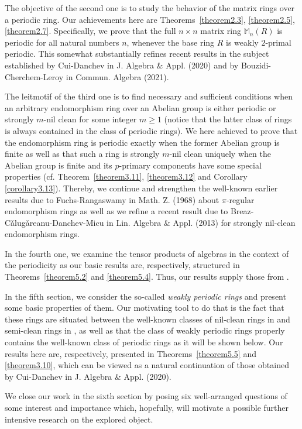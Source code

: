 \documentclass[12pt]{amsart}
\theoremstyle{definition}
\theoremstyle{remark}
\numberwithin{equation}{section}
\begin{document}
The objective of the second one is to study the behavior of the matrix rings over a periodic ring. Our achievements here are Theorems~\ref{theorem2.3}, \ref{theorem2.5}, \ref{theorem2.7}. Specifically, we prove that the full $n\times n$ matrix ring $\mathbb{M}_n(R)$ is periodic for all natural numbers $n$, whenever the base ring $R$ is weakly $2$-primal periodic. This somewhat substantially refines recent results in the subject established by Cui-Danchev in J. Algebra \& Appl. (2020) and by Bouzidi-Cherchem-Leroy in Commun. Algebra (2021).

The leitmotif of the third one is to find necessary and sufficient conditions when an arbitrary endomorphism ring over an Abelian group is either periodic or strongly $m$-nil clean for some integer $m\geq 1$ (notice that the latter class of rings is always contained in the class of periodic rings). We here achieved to prove that the endomorphism ring is periodic exactly when the former Abelian group is finite as well as that such a ring is strongly $m$-nil clean uniquely when the Abelian group is finite and its $p$-primary components have some special properties (cf. Theorem~\ref{theorem3.11}, \ref{theorem3.12} and Corollary \ref{corollary3.13}). Thereby, we continue and strengthen the well-known earlier results due to Fuchs-Rangaswamy in Math. Z. (1968) about $\pi$-regular endomorphism rings as well as we refine a recent result due to Breaz-C\v{a}lug\v{a}reanu-Danchev-Micu in Lin. Algebra \& Appl. (2013) for strongly nil-clean endomorphism rings.

In the fourth one, we examine the tensor products of algebras in the context of the periodicity as our basic results are, respectively, structured in Theorems~\ref{theorem5.2} and \ref{theorem5.4}. Thus, our results supply those from \cite{S}.

In the fifth section, we consider the so-called {\it weakly periodic rings} and present some basic properties of them. Our motivating tool to do that is the fact that these rings are situated between the well-known classes of nil-clean rings in \cite{D13} and semi-clean rings in \cite{Ye}, as well as that the class of weakly periodic rings properly contains the well-known class of periodic rings as it will be shown below. Our results here are, respectively, presented in Theorems~\ref{theorem5.5} and \ref{theorem3.10}, which can be viewed as a natural continuation of those obtained by Cui-Danchev in J. Algebra \& Appl. (2020).

We close our work in the sixth section by posing six well-arranged questions of some interest and importance which, hopefully, will motivate a possible further intensive research on the explored object.
\end{document}
